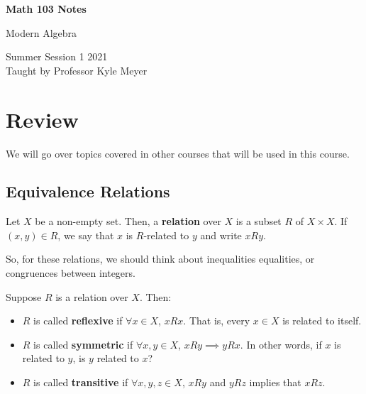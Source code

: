 \documentclass[letterpaper]{article}
\begin{document}
\begin{titlepage}
    \begin{center}
        \vspace*{1cm}
            
        \Huge
        \textbf{Math 103 Notes}
            
        \vspace{0.5cm}
        \LARGE
        Modern Algebra
            
        \vspace{1.5cm}
            
        \vfill
            
        Summer Session 1 2021\\
        Taught by Professor Kyle Meyer
    \end{center}
\end{titlepage}


\newpage 

\begingroup
    \renewcommand\contentsname{Table of Contents}
    \tableofcontents
\endgroup

\newpage
{}

\section{Review}
We will go over topics covered in other courses that will be used in this course. 

\subsection{Equivalence Relations}
Let $X$ be a non-empty set. Then, a \textbf{relation} over $X$ is a subset $R$ of $X \times X$. If $(x, y) \in R$, we say that $x$ is $R$-related to $y$ and write $x R y$. 

\bigskip 

So, for these relations, we should think about inequalities equalities, or congruences between integers. 

\bigskip 

Suppose $R$ is a relation over $X$. Then:
\begin{itemize}
    \item $R$ is called \textbf{reflexive} if $\forall x \in X$, $x R x$. That is, every $x \in X$ is related to itself. 
    \item $R$ is called \textbf{symmetric} if $\forall x, y \in X$, $x R y \implies y R x$. In other words, if $x$ is related to $y$, is $y$ related to $x$? 
    \item $R$ is called \textbf{transitive} if $\forall x, y, z \in X$, $x R y$ and $y R z$ implies that $x R z$. 
\end{itemize}
\end{document}
